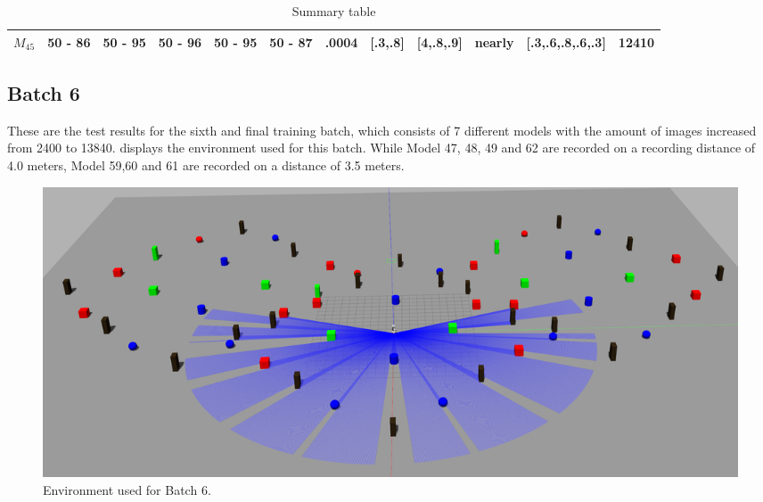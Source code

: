 \begin{table}[H]
{\begin{tabular}{|c|c|c|c|c|c|c|c|c|c|c|c|}
\rowcolor[HTML]{FFFFFF} 
$M_{45}$                                                                             & 50 - 86                                 & 50 - 95                                 & 50 - 96                                 & 50 - 95                                 & 50 - 87                                 & .0004                                                                                   & {[}.3,.8{]}                                                                                 & {[}4,.8,.9{]}                                                                               & nearly                                                                                    & {[}.3,.6,.8,.6,.3{]}                                                                    & 12410                                                                                     \\ \hline
\end{tabular}
}
\caption{Summary table}
\label{tab:summary_table_5}
\end{table}

\newpage

\subsection{Batch 6 \label{batch_6} }
These are the test results for the sixth and final training batch, which consists of 7 different models with the amount of images increased from 2400 to 13840.  displays the environment used for this batch. While Model 47, 48, 49 and 62 are recorded on a recording distance of 4.0 meters, Model 59,60 and 61 are recorded on a distance of 3.5 meters.

\begin{figure}[H]%
\centering
\includegraphics[width=1\textwidth]{Bilder/env6.png} 
\caption[]{Environment used for Batch 6.}
\label{env6}
\end{figure}

